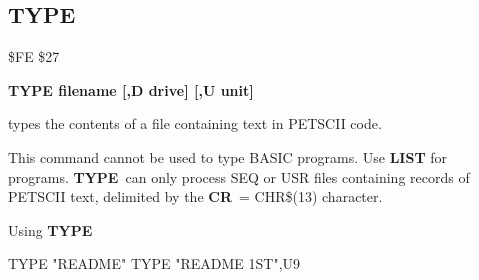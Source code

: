 \subsection{TYPE}
\begin{description}[leftmargin=3cm,style=nextline]
\item [Token:] \$FE \$27
\item [Format:] {\bf TYPE filename [,D drive] [,U unit] }
\item [Usage:] types the contents of a file containing
      text in PETSCII code.

   \filenamedefinition

   \drivedefinition

   \unitdefinition

\item [Remarks:] This command cannot be used to type
                 BASIC programs. Use {\bf LIST} for programs.
                 {\bf TYPE} can only process SEQ or USR files
                 containing records of PETSCII text, delimited
                 by the {\bf CR} = CHR\$(13) character.

\item [Example:] Using {\bf TYPE}
\begin{screenoutput}
  TYPE "README"
  TYPE "README 1ST",U9
\end{screenoutput}
\end{description}


\newpage
